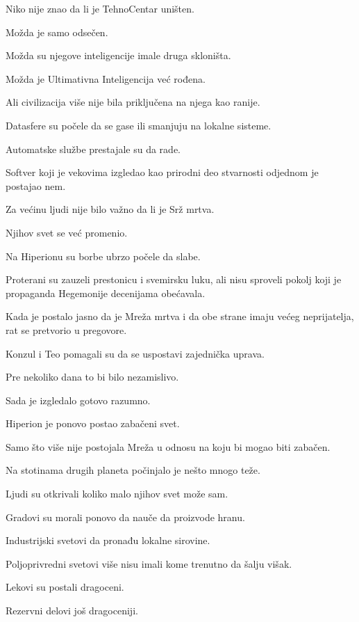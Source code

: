 Niko nije znao da li je TehnoCentar uništen.

Možda je samo odsečen.

Možda su njegove inteligencije imale druga skloništa.

Možda je Ultimativna Inteligencija već rođena.

Ali civilizacija više nije bila priključena na njega kao ranije.

Datasfere su počele da se gase ili smanjuju na lokalne sisteme.

Automatske službe prestajale su da rade.

Softver koji je vekovima izgledao kao prirodni deo stvarnosti odjednom je postajao nem.

\bigskip

Za većinu ljudi nije bilo važno da li je Srž mrtva.

Njihov svet se već promenio.

\bigskip

Na Hiperionu su borbe ubrzo počele da slabe.

Proterani su zauzeli prestonicu i svemirsku luku, ali nisu sproveli pokolj koji je propaganda Hegemonije decenijama obećavala.

Kada je postalo jasno da je Mreža mrtva i da obe strane imaju većeg neprijatelja, rat se pretvorio u pregovore.

Konzul i Teo pomagali su da se uspostavi zajednička uprava.

Pre nekoliko dana to bi bilo nezamislivo.

Sada je izgledalo gotovo razumno.

\bigskip

Hiperion je ponovo postao zabačeni svet.

Samo što više nije postojala Mreža u odnosu na koju bi mogao biti zabačen.

\bigskip

Na stotinama drugih planeta počinjalo je nešto mnogo teže.

Ljudi su otkrivali koliko malo njihov svet može sam.

Gradovi su morali ponovo da nauče da proizvode hranu.

Industrijski svetovi da pronađu lokalne sirovine.

Poljoprivredni svetovi više nisu imali kome trenutno da šalju višak.

Lekovi su postali dragoceni.

Rezervni delovi još dragoceniji.

